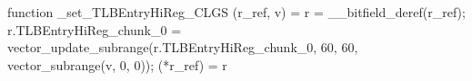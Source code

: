 function _set_TLBEntryHiReg_CLGS (r_ref, v) = {
    r = __bitfield_deref(r_ref);
    r.TLBEntryHiReg_chunk_0 = vector_update_subrange(r.TLBEntryHiReg_chunk_0, 60, 60, vector_subrange(v, 0, 0));
    (*r_ref) = r
}
